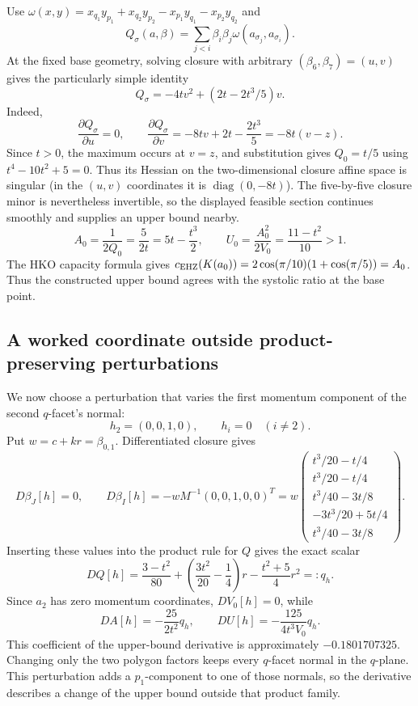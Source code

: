 Use $\omega(x,y)=x_{q_1}y_{p_1}+x_{q_2}y_{p_2}-x_{p_1}y_{q_1}-x_{p_2}y_{q_2}$ and
\[
 Q_\sigma(a,\beta)=\sum_{j<i}\beta_i\beta_j\omega(a_{\sigma_j},a_{\sigma_i}).
\]
At the fixed base geometry, solving closure with arbitrary
$(\beta_6,\beta_7)=(u,v)$ gives the particularly simple identity
\[
 Q_\sigma=-4tv^2+(2t-2t^3/5)v.
\]
Indeed,
\[
 \frac{\partial Q_\sigma}{\partial u}=0,\qquad
 \frac{\partial Q_\sigma}{\partial v}
 =-8tv+2t-\frac{2t^3}{5}=-8t(v-z).
\]
Since $t>0$, the maximum occurs at $v=z$, and substitution gives
$Q_0=t/5$ using $t^4-10t^2+5=0$.
Thus its Hessian on the two-dimensional closure affine space is singular
(in the $(u,v)$ coordinates it is $\operatorname{diag}(0,-8t)$).
The five-by-five closure minor is nevertheless invertible, so the displayed
feasible section continues smoothly and supplies an upper bound nearby.
\[
 A_0=\frac1{2Q_0}=\frac5{2t}=5t-\frac{t^3}{2},\qquad
 U_0=\frac{A_0^2}{2V_0}=\frac{11-t^2}{10}>1.
\]
The HKO capacity formula gives
$c_{\rm EHZ}(K(a_0))=2\cos(\pi/10)(1+\cos(\pi/5))=A_0$.
Thus the constructed upper bound agrees with the systolic ratio at the
base point.

\subsection*{A worked coordinate outside product-preserving perturbations}
We now choose a perturbation that varies the first momentum component of
the second $q$-facet's normal:
\[
 h_2=(0,0,1,0),\qquad h_i=0\quad(i\ne2).
\]
Put $w=c+kr=\beta_{0,1}$. Differentiated closure gives
\[
 D\beta_J[h]=0,\qquad D\beta_I[h]=-wM^{-1}(0,0,1,0,0)^T
 =w\begin{pmatrix}
 t^3/20-t/4\\t^3/20-t/4\\t^3/40-3t/8\\-3t^3/20+5t/4\\t^3/40-3t/8
 \end{pmatrix}.
\]
Inserting these values into the product rule for $Q$ gives the exact scalar
\[
 DQ[h]=\frac{3-t^2}{80}+
 \left(\frac{3t^2}{20}-\frac14\right)r
 -\frac{t^2+5}{4}r^2=:q_h.
\]
Since $a_2$ has zero momentum coordinates, $DV_0[h]=0$, while
\[
 DA[h]=-\frac{25}{2t^2}q_h,\qquad
 DU[h]=-\frac{125}{4t^3V_0}q_h.
\]
This coefficient of the upper-bound derivative is approximately
$-0.1801707325$. Changing only the two polygon factors keeps every
$q$-facet normal in the $q$-plane. This perturbation adds a $p_1$-component
to one of those normals, so the derivative describes a change of the upper
bound outside that product family.

